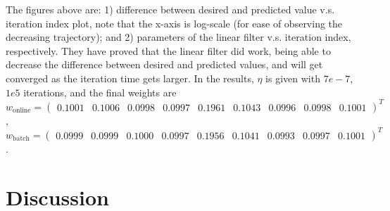 \documentclass[12pt]{article}
\begin{document}
The figures above are: 1) difference between desired and predicted value v.s. iteration index plot, note that the x-axis is log-scale (for ease of observing the decreasing trajectory); and 2) parameters of the linear filter v.s. iteration index, respectively. They have proved that the linear filter did work, being able to decrease the difference between desired and predicted values, and will get converged as the iteration time gets larger. In the results, $\eta$ is given with $7e-7$, $1e5$ iterations, and the final weights are
$w_\text{online} = \begin{pmatrix} 0.1001 & 0.1006 & 0.0998 & 0.0997 & 0.1961 & 0.1043 & 0.0996 & 0.0998 & 0.1001 \end{pmatrix}^T$, 
$w_\text{batch} = \begin{pmatrix} 0.0999 & 0.0999 & 0.1000 & 0.0997 & 0.1956 & 0.1041 & 0.0993 & 0.0997 & 0.1001 \end{pmatrix}^T$.

\section*{Discussion}
\vspace{-20pt}
\noindent\makebox[\linewidth]{\rule{\textwidth}{0.4pt}}
\end{document}
